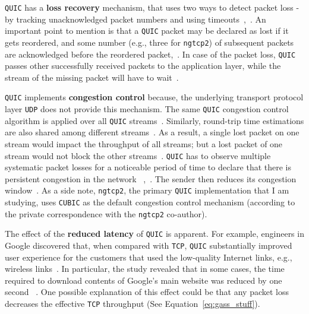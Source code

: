 \documentclass[12pt,a4paper]{report}
\begin{document}
    
    
    \texttt{QUIC} has a \textbf{loss recovery} mechanism, that uses two ways to detect packet loss - by tracking unacknowledged packet numbers and using timeouts~\cite{UnderstandQUIC},~\cite[Section~6]{ietf-quic-recovery-32}.
    An important point to mention is that a \texttt{QUIC} packet may be declared as lost if it gets reordered, and some number (e.g., three for \texttt{ngtcp2}) of subsequent packets are acknowledged before the reordered packet,~\cite[Section~6]{ietf-quic-recovery-32}.
    In case of the packet loss, \texttt{QUIC} passes other successfully received packets to the application layer, while the stream of the missing packet will have to wait~\cite{head-of-line-blocking-in-quic-and-http-3-the-details}.
   
   \texttt{QUIC} implements \textbf{congestion control} because, the underlying transport protocol layer \texttt{UDP} does not provide this mechanism. 
   The same \texttt{QUIC} congestion control algorithm is applied over all \texttt{QUIC} streams~\cite{head-of-line-blocking-in-quic-and-http-3-the-details, UnderstandQUIC}.
   Similarly, round-trip time estimations are also shared among different streams~\cite[Section~4.2]{ietf-quic-recovery-32}.
   As a result, a single lost packet on one stream would impact the throughput of all streams; but a lost packet of one stream would not block the other streams~\cite{head-of-line-blocking-in-quic-and-http-3-the-details, UnderstandQUIC}.
    \texttt{QUIC} has to observe multiple systematic packet losses for a noticeable period of time to declare that there is persistent congestion in the network ~\cite[Section~4]{ietf-quic-recovery-32},~\cite{UnderstandQUIC}.
   The sender then reduces its congestion window~\cite{UnderstandQUIC}.
   As a side note, \texttt{ngtcp2}, the primary \texttt{QUIC} implementation that I am studying, uses \texttt{CUBIC} as the default congestion control mechanism (according to the private correspondence with the \texttt{ngtcp2} co-author).
  
  

 

  
  
   The effect of the \textbf{reduced latency} of \texttt{QUIC} is apparent.
  For example, engineers in Google discovered that, when compared with \texttt{TCP}, \texttt{QUIC} substantially improved user experience for the customers that used the low-quality Internet links, e.g., wireless links~\cite{chromium_blog_about_quic, quic-vs-tcptls-and-why-quic-is-not-the-next-big-thing}.
  In particular, the study revealed that in some cases, the time required to download contents of Google's main website was reduced by one second ~\cite{chromium_blog_about_quic}.
  One possible explanation of this effect could be that any packet loss decreases the effective \texttt{TCP} throughput (See Equation~\ref{eq:gass_stuff}).
  
\end{document}
